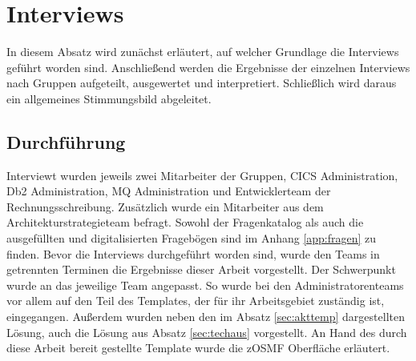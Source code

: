 \section{Interviews}
In diesem Absatz wird zunächst erläutert, auf welcher Grundlage die Interviews geführt worden sind.
Anschließend werden die Ergebnisse der einzelnen Interviews nach Gruppen aufgeteilt, ausgewertet und interpretiert.
Schließlich wird daraus ein allgemeines Stimmungsbild abgeleitet.

\subsection{Durchführung}
Interviewt wurden jeweils zwei Mitarbeiter der Gruppen, CICS Administration, Db2 Administration, MQ Administration und Entwicklerteam der Rechnungsschreibung.
Zusätzlich wurde ein Mitarbeiter aus dem Architekturstrategieteam befragt.
Sowohl der Fragenkatalog als auch die ausgefüllten und digitalisierten Fragebögen sind im Anhang \ref{app:fragen} zu finden.
Bevor die Interviews durchgeführt worden sind, wurde den Teams in getrennten Terminen die Ergebnisse dieser Arbeit vorgestellt.
Der Schwerpunkt wurde an das jeweilige Team angepasst.
So wurde bei den Administratorenteams vor allem auf den Teil des Templates, der für ihr Arbeitsgebiet zuständig ist, eingegangen.
Außerdem wurden neben den im Absatz \ref{sec:akttemp} dargestellten Lösung, auch die Lösung aus Absatz \ref{sec:techaus} vorgestellt.
An Hand des durch diese Arbeit bereit gestellte Template wurde die zOSMF Oberfläche erläutert.

